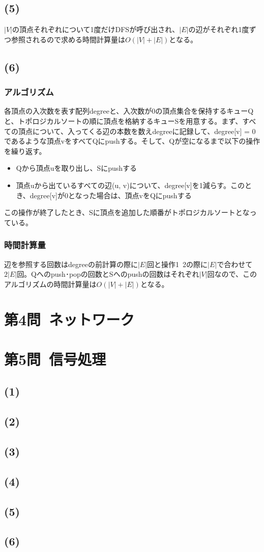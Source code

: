 \documentclass[a4paper,12pt,xelatex,ja=standard]{bxjsarticle}
\begin{document}
\subsection*{(5)}
$|V|$の頂点それぞれについて1度だけDFSが呼び出され、$|E|$の辺がそれぞれ1度ずつ参照されるので求める時間計算量は$O(|V| + |E|)$となる。

\subsection*{(6)}
\subsubsection*{アルゴリズム}
各頂点の入次数を表す配列degreeと、入次数が0の頂点集合を保持するキューQと、トポロジカルソートの順に頂点を格納するキューSを用意する。まず、すべての頂点について、入ってくる辺の本数を数えdegreeに記録して、degree[v] = 0であるような頂点vをすべてQにpushする。そして、Qが空になるまで以下の操作を繰り返す。
\begin{itemize}
  \item Qから頂点uを取り出し、Sにpushする
  \item 頂点uから出ているすべての辺(u, v)について、degree[v]を1減らす。このとき、degree[v]が0となった場合は、頂点vをQにpushする
\end{itemize}
この操作が終了したとき、Sに頂点を追加した順番がトポロジカルソートとなっている。

\subsubsection*{時間計算量}
辺を参照する回数はdegreeの前計算の際に$|E|$回と操作1~2の際に$|E|$で合わせて$2|E|$回。Qへのpush･popの回数とSへのpushの回数はそれぞれ$|V|$回なので、このアルゴリズムの時間計算量は$O(|V| + |E|)$となる。

\section*{第4問\ ネットワーク}

\section*{第5問\ 信号処理}
\subsection*{(1)}

\subsection*{(2)}

\subsection*{(3)}

\subsection*{(4)}

\subsection*{(5)}

\subsection*{(6)}
\end{document}
